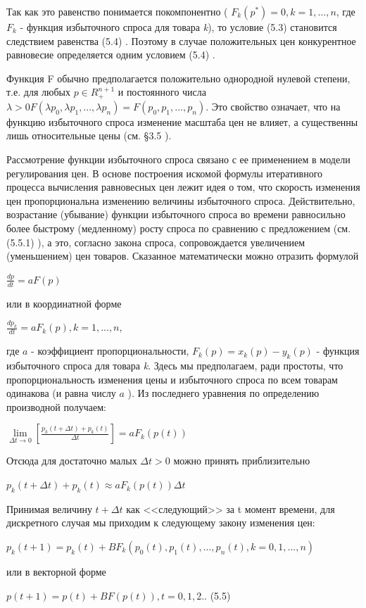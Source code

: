 \documentclass[12pt, 4paper]{book}
\begin{document}
{Так как это равенство понимается покомпонентно ( $F_k(p^{*}) = 0,k = 1,...,n $, где $F_k$ - функция избыточного спроса для товара \textit{k}), то условие (5.3) становится следствием равенства (5.4) . Поэтому в случае положительных цен конкурентное равновесие определяется одним условием (5.4) .
\par

Функция F обычно предполагается положительно однородной нулевой степени, т.е. для любых $p \in R_{+}^{n+1}$ и постоянного числа  $\lambda >0 F(\lambda p_0,\lambda p_1,...,\lambda p_n)=F(p_0,p_1,...,p_n)$. Это свойство означает, что на функцию избыточного спроса изменение масштаба цен не влияет, а существенны лишь относительные цены (см. §3.5 ). 
\par

Рассмотрение функции избыточного спроса связано с ее применением в модели регулирования цен. В основе построения искомой формулы итеративного процесса вычисления равновесных цен лежит идея о том, что скорость изменения цен пропорциональна изменению величины избыточного спроса. Действительно, возрастание (убывание) функции избыточного спроса во времени равносильно более быстрому (медленному) росту спроса по сравнению с предложением (см. (5.5.1) ), а это, согласно закона спроса, сопровождается увеличением (уменьшением) цен товаров. Сказанное математически можно отразить формулой
\begin{center}
$\frac{dp}{dt} = a F(p)$
\end{center}
или в координатной форме
\begin{center}
$\frac{d p_k}{dt} = aF_k(p), k=1,...,n$,
\end{center}
где $a$ - коэффициент пропорциональности, $F_k(p)=x_k(p)-y_k(p)$ - функция избыточного спроса для товара \textit{k}. Здесь мы предполагаем, ради простоты, что пропорциональность изменения цены и избыточного спроса по всем товарам одинакова (и равна числу $a$ ).
Из последнего уравнения по определению производной получаем:
\begin{center}
$\lim\limits_{\Delta t \rightarrow 0}[\frac{p_k (t+ \Delta t)+p_k(t)}{\Delta t}]=a F_k(p(t))$
\end{center}
Отсюда для достаточно малых $\Delta t >0$ можно принять приблизительно
\begin{center}
$p_k(t+\Delta t)+ p_k(t) \approx a F_k(p(t)) \Delta t$
\end{center}
\par

Принимая величину $t + \Delta t$ как <<следующий>> за t момент времени, для дискретного случая мы приходим к следующему закону изменения цен:
\begin{center}
$p_k(t+1)=p_k(t)+BF_k(p_0(t),p_1(t),...,p_n(t), k=0,1,...,n)$
\end{center}
или в векторной форме
\begin{center}
$p(t+1)=p(t)+BF(p(t)),t = 0,1,2..$ (5.5)
\end{center}
\par

}
\end{document}
